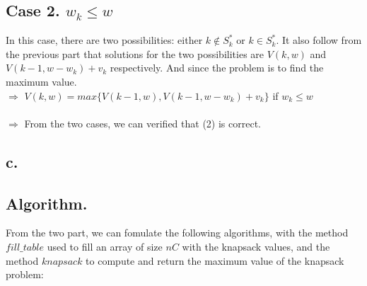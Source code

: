 \documentclass{article}
\begin{document}
\subsection*{Case 2. $w_k \leq w$}
In this case, there are two possibilities: either $k \notin S^*_k$ or $k \in S^*_k$. It also follow from the previous part that solutions for the two possibilities are $V(k, w)$ and  $V(k-1, w-w_k) + v_k$ respectively.  And since the problem is to find the maximum value. \\
$\Rightarrow$ $V(k, w) = max\{V(k-1, w), V(k-1, w-w_k) + v_k\}$ if $w_k \leq w$ \\\\


$\Longrightarrow$ From the two cases, we can verified that (2) is correct.


\pagebreak
\subsection*{c.}
\subsection*{Algorithm.}
From the two part, we can fomulate the following algorithms, with the method $fill\_table$ used to fill an array of size $nC$ with the knapsack values, and the method $knapsack$ to compute and return the maximum value of the knapsack problem:
\begin{algorithm}
\caption{$fill\_table(n, C, arr)$}\label{alg:cap}
\begin{algorithmic}
        \Else
        \EndIf
    \EndFor
\EndFor
\end{algorithmic}
\end{algorithm}

\begin{algorithm}
\caption{$knapsack(n, C)$}\label{alg:cap}
\begin{algorithmic}
  
\end{algorithmic}
\end{algorithm}
\end{document}
